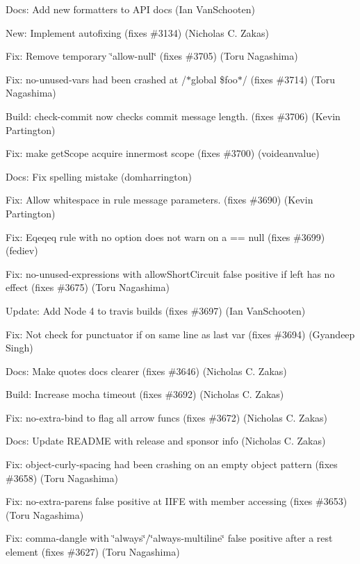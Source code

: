 \begin{DoxyItemize}
\item Docs\+: Add new formatters to A\+PI docs (Ian Van\+Schooten)
\item New\+: Implement autofixing (fixes \#3134) (Nicholas C. Zakas)
\item Fix\+: Remove temporary {\ttfamily \char`\"{}allow-\/null\char`\"{}} (fixes \#3705) (Toru Nagashima)
\item Fix\+: {\ttfamily no-\/unused-\/vars} had been crashed at {\ttfamily /$\ast$global \$foo$\ast$/} (fixes \#3714) (Toru Nagashima)
\item Build\+: check-\/commit now checks commit message length. (fixes \#3706) (Kevin Partington)
\item Fix\+: make get\+Scope acquire innermost scope (fixes \#3700) (voideanvalue)
\item Docs\+: Fix spelling mistake (domharrington)
\item Fix\+: Allow whitespace in rule message parameters. (fixes \#3690) (Kevin Partington)
\item Fix\+: Eqeqeq rule with no option does not warn on \textquotesingle{}a == null\textquotesingle{} (fixes \#3699) (fediev)
\item Fix\+: {\ttfamily no-\/unused-\/expressions} with {\ttfamily allow\+Short\+Circuit} false positive if left has no effect (fixes \#3675) (Toru Nagashima)
\item Update\+: Add Node 4 to travis builds (fixes \#3697) (Ian Van\+Schooten)
\item Fix\+: Not check for punctuator if on same line as last var (fixes \#3694) (Gyandeep Singh)
\item Docs\+: Make {\ttfamily quotes} docs clearer (fixes \#3646) (Nicholas C. Zakas)
\item Build\+: Increase mocha timeout (fixes \#3692) (Nicholas C. Zakas)
\item Fix\+: {\ttfamily no-\/extra-\/bind} to flag all arrow funcs (fixes \#3672) (Nicholas C. Zakas)
\item Docs\+: Update R\+E\+A\+D\+ME with release and sponsor info (Nicholas C. Zakas)
\item Fix\+: {\ttfamily object-\/curly-\/spacing} had been crashing on an empty object pattern (fixes \#3658) (Toru Nagashima)
\item Fix\+: {\ttfamily no-\/extra-\/parens} false positive at I\+I\+FE with member accessing (fixes \#3653) (Toru Nagashima)
\item Fix\+: {\ttfamily comma-\/dangle} with {\ttfamily \char`\"{}always\char`\"{}}/{\ttfamily \char`\"{}always-\/multiline\char`\"{}} false positive after a rest element (fixes \#3627) (Toru Nagashima)

\end{DoxyItemize}
